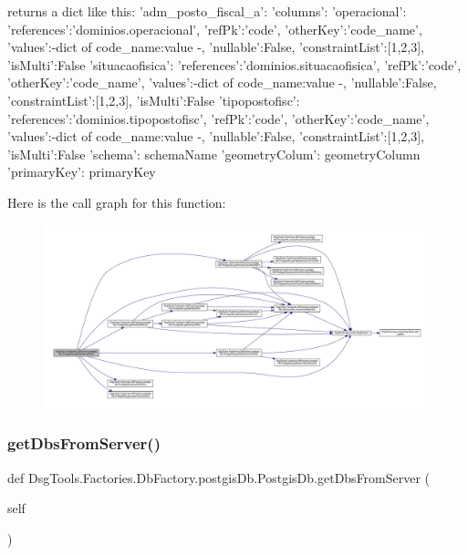 \begin{DoxyVerb}returns a dict like this:
{'adm_posto_fiscal_a': {
    'columns':{
'operacional': {'references':'dominios.operacional', 'refPk':'code', 'otherKey':'code_name', 'values':{-dict of code_name:value -}, 'nullable':False, 'constraintList':[1,2,3], 'isMulti':False}
'situacaofisica': {'references':'dominios.situacaofisica', 'refPk':'code', 'otherKey':'code_name', 'values':{-dict of code_name:value -}, 'nullable':False, 'constraintList':[1,2,3], 'isMulti':False}
'tipopostofisc': {'references':'dominios.tipopostofisc', 'refPk':'code', 'otherKey':'code_name', 'values':{-dict of code_name:value -}, 'nullable':False, 'constraintList':[1,2,3], 'isMulti':False}
}
    'schema': schemaName
    'geometryColum': geometryColumn
    'primaryKey': primaryKey
    }
}
\end{DoxyVerb}
 Here is the call graph for this function\+:
\nopagebreak
\begin{figure}[H]
\begin{center}
\leavevmode
\includegraphics[width=350pt]{class_dsg_tools_1_1_factories_1_1_db_factory_1_1postgis_db_1_1_postgis_db_a7aadf24584f50de40fc86a9ee04aa140_cgraph}
\end{center}
\end{figure}
\mbox{\label{class_dsg_tools_1_1_factories_1_1_db_factory_1_1postgis_db_1_1_postgis_db_a0cbf4eb6f5c3e387469e5ee8113b1319}} 
\subsubsection{\texorpdfstring{get\+Dbs\+From\+Server()}{getDbsFromServer()}}
{\footnotesize\ttfamily def Dsg\+Tools.\+Factories.\+Db\+Factory.\+postgis\+Db.\+Postgis\+Db.\+get\+Dbs\+From\+Server (\begin{DoxyParamCaption}\item[{}]{self }\end{DoxyParamCaption})}

